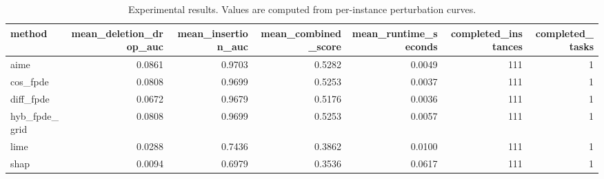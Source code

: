 \begin{table}[t]
\caption{Experimental results. Values are computed from per-instance perturbation curves.}
\label{tab:main_results_computed}
\centering
\begin{tabular}{lrrrrrr}
\toprule
method & mean\_deletion\_drop\_auc & mean\_insertion\_auc & mean\_combined\_score & mean\_runtime\_seconds & completed\_instances & completed\_tasks \\
\midrule
aime & 0.0861 & 0.9703 & 0.5282 & 0.0049 & 111 & 1 \\
cos\_fpde & 0.0808 & 0.9699 & 0.5253 & 0.0037 & 111 & 1 \\
diff\_fpde & 0.0672 & 0.9679 & 0.5176 & 0.0036 & 111 & 1 \\
hyb\_fpde\_grid & 0.0808 & 0.9699 & 0.5253 & 0.0057 & 111 & 1 \\
lime & 0.0288 & 0.7436 & 0.3862 & 0.0100 & 111 & 1 \\
shap & 0.0094 & 0.6979 & 0.3536 & 0.0617 & 111 & 1 \\
\bottomrule
\end{tabular}

\end{table}
